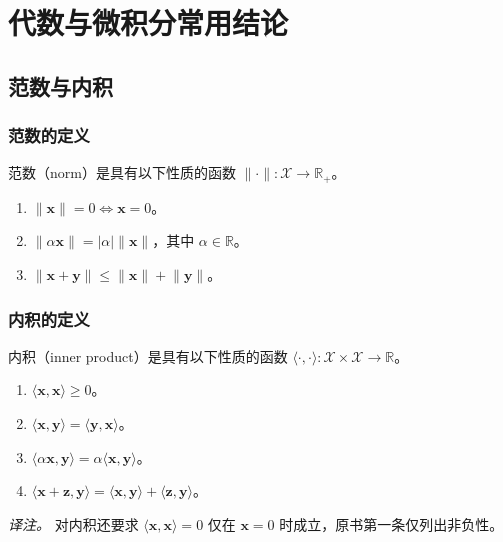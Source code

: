 \chapter{代数与微积分常用结论}
\label{app:algebra}

\section{范数与内积}
\subsection{范数的定义}
范数（norm）是具有以下性质的函数 $\lVert\cdot\rVert\colon\mathcal{X}\to\mathbb{R}_+$。
\begin{enumerate}
\item $\lVert\mathbf{x}\rVert=0\iff\mathbf{x}=0$。
\item $\lVert\alpha\mathbf{x}\rVert=|\alpha|\lVert\mathbf{x}\rVert$，其中 $\alpha\in\mathbb{R}$。
\item $\lVert\mathbf{x}+\mathbf{y}\rVert\le\lVert\mathbf{x}\rVert+\lVert\mathbf{y}\rVert$。
\end{enumerate}

\subsection{内积的定义}
内积（inner product）是具有以下性质的函数 $\langle\cdot,\cdot\rangle\colon\mathcal{X}\times\mathcal{X}\to\mathbb{R}$。
\begin{enumerate}
\item $\langle\mathbf{x},\mathbf{x}\rangle\ge 0$。
\item $\langle\mathbf{x},\mathbf{y}\rangle=\langle\mathbf{y},\mathbf{x}\rangle$。
\item $\langle\alpha\mathbf{x},\mathbf{y}\rangle=\alpha\langle\mathbf{x},\mathbf{y}\rangle$。
\item $\langle\mathbf{x}+\mathbf{z},\mathbf{y}\rangle=\langle\mathbf{x},\mathbf{y}\rangle+\langle\mathbf{z},\mathbf{y}\rangle$。
\end{enumerate}
\emph{译注。} 对内积还要求 $\langle\mathbf{x},\mathbf{x}\rangle=0$ 仅在 $\mathbf{x}=0$ 时成立，原书第一条仅列出非负性。

